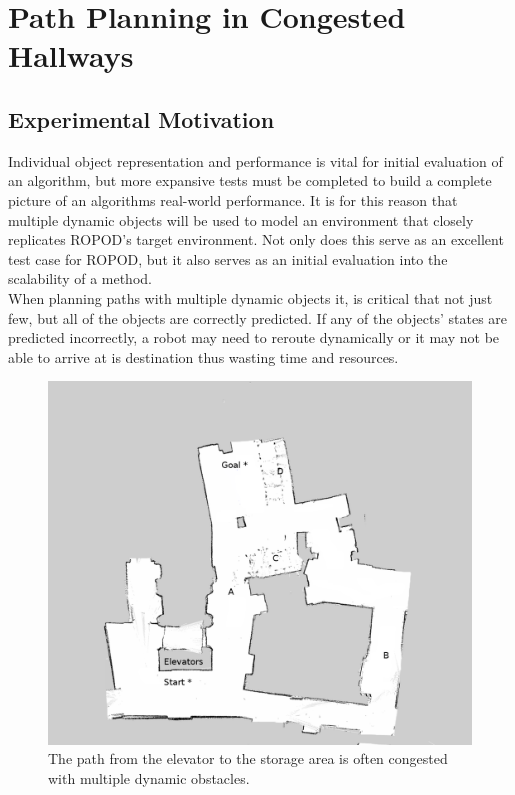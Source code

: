   \clearpage
  \section{ Path Planning in Congested Hallways}

  \subsection{ Experimental Motivation }

  Individual object representation and performance is vital for initial
  evaluation of an algorithm, but more expansive tests must be completed to
  build a complete picture of an algorithms real-world performance. It is for
  this reason that multiple dynamic objects will be used to model an environment
  that closely replicates ROPOD's target environment. Not only does this
  serve as an excellent test case for ROPOD, but it also serves as an initial
  evaluation into the scalability of a method. \\

  When planning paths with multiple dynamic objects it, is critical that not just
  few, but all of the objects are correctly predicted. If any of the objects' states are
  predicted incorrectly, a robot may need to reroute dynamically or it may not
  be able to arrive at is destination thus wasting time and resources.


  \begin{figure}[!htb]
    \centering
    \includegraphics[width=\linewidth]{images/basement_congestion.png}
    \caption{The path from the elevator to the storage area is often congested with multiple dynamic obstacles. }
    \label{figure:basement_congestion}
  \end{figure}

